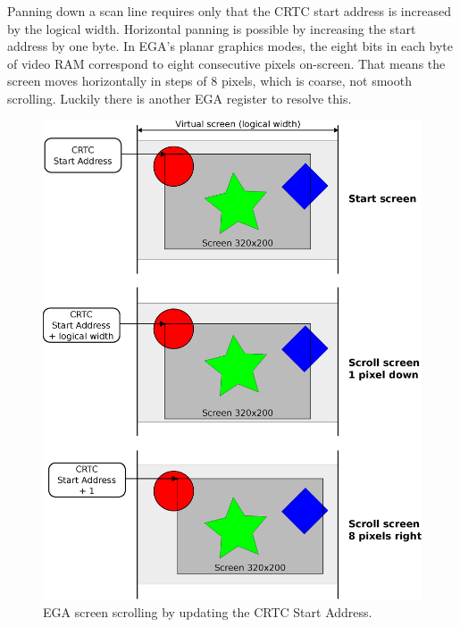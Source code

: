\documentclass[book.tex]{subfiles}
\begin{document}
\begin{minipage}{\textwidth}
  
  \end{minipage}
  \label{ega_set_address}
  \par


\par
Panning down a scan line requires only that the CRTC start address is increased by the logical width. Horizontal panning is possible by increasing the start address by one byte. In EGA's planar graphics modes, the eight bits in each byte of video RAM correspond to eight consecutive pixels on-screen. That means the screen moves horizontally in steps of 8 pixels, which is coarse, not smooth scrolling. Luckily there is another EGA register to resolve this.\\

\begin{figure}[H]
\centering
\includegraphics[width=1.0\textwidth]{imgs/drawings/virtual_screen.eps}
\caption{EGA screen scrolling by updating the CRTC Start Address.}
\label{fig:tile_refresh}
\end{figure}
\end{document}
